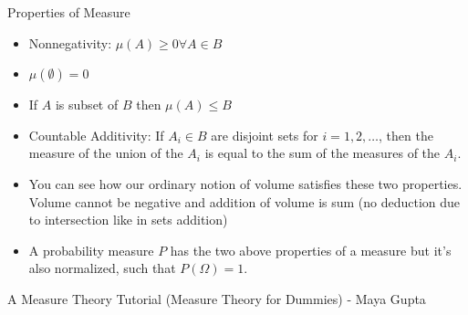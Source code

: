   \begin{frame}[fragile]{Properties of Measure}
\begin{itemize} 
\item Nonnegativity: $\mu(A) \geq 0 \forall A \in B$
\item $\mu(\emptyset) = 0$
\item If $A$ is subset of $B$ then $\mu(A) \leq B$
\item Countable Additivity: If $A_i \in B$ are disjoint sets for $i = 1, 2, \ldots$, then the measure of the union of the $A_i$ is equal to the sum of the measures of the $A_i$.
\item You can see how our ordinary notion of volume satisfies these two properties. Volume cannot be negative and addition of volume is sum (no deduction due to intersection like in sets addition)
\item A probability measure $P$ has
the two above properties of a measure but it’s also normalized, such that $P(\Omega) = 1$.

\end{itemize}

\tiny{A Measure Theory Tutorial (Measure Theory for Dummies) - Maya Gupta}
\end{frame}